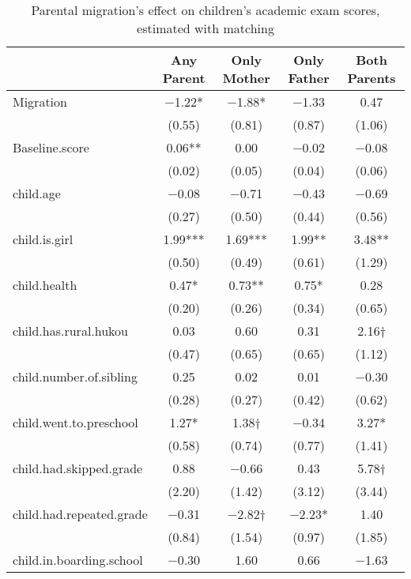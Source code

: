 \documentclass[
  man,floatsintext]{apa7}
\begin{document}
\begin{table}

\caption{Parental migration’s effect on children’s academic exam scores, estimated with matching}
\centering
\begin{tabular}[t]{lcccc}
\toprule
  & Any Parent & Only Mother & Only Father & Both Parents\\
\midrule
Migration & \num{-1.22}* & \num{-1.88}* & \num{-1.33} & \num{0.47}\\
 & (\num{0.55}) & (\num{0.81}) & (\num{0.87}) & (\num{1.06})\\
Baseline.score & \num{0.06}** & \num{0.00} & \num{-0.02} & \num{-0.08}\\
 & (\num{0.02}) & (\num{0.05}) & (\num{0.04}) & (\num{0.06})\\
child.age & \num{-0.08} & \num{-0.71} & \num{-0.43} & \num{-0.69}\\
 & (\num{0.27}) & (\num{0.50}) & (\num{0.44}) & (\num{0.56})\\
child.is.girl & \num{1.99}*** & \num{1.69}*** & \num{1.99}** & \num{3.48}**\\
 & (\num{0.50}) & (\num{0.49}) & (\num{0.61}) & (\num{1.29})\\
child.health & \num{0.47}* & \num{0.73}** & \num{0.75}* & \num{0.28}\\
 & (\num{0.20}) & (\num{0.26}) & (\num{0.34}) & (\num{0.65})\\
child.has.rural.hukou & \num{0.03} & \num{0.60} & \num{0.31} & \num{2.16}†\\
 & (\num{0.47}) & (\num{0.65}) & (\num{0.65}) & (\num{1.12})\\
child.number.of.sibling & \num{0.25} & \num{0.02} & \num{0.01} & \num{-0.30}\\
 & (\num{0.28}) & (\num{0.27}) & (\num{0.42}) & (\num{0.62})\\
child.went.to.preschool & \num{1.27}* & \num{1.38}† & \num{-0.34} & \num{3.27}*\\
 & (\num{0.58}) & (\num{0.74}) & (\num{0.77}) & (\num{1.41})\\
child.had.skipped.grade & \num{0.88} & \num{-0.66} & \num{0.43} & \num{5.78}†\\
 & (\num{2.20}) & (\num{1.42}) & (\num{3.12}) & (\num{3.44})\\
child.had.repeated.grade & \num{-0.31} & \num{-2.82}† & \num{-2.23}* & \num{1.40}\\
 & (\num{0.84}) & (\num{1.54}) & (\num{0.97}) & (\num{1.85})\\
child.in.boarding.school & \num{-0.30} & \num{1.60} & \num{0.66} & \num{-1.63}\\

\end{tabular}
\end{table}
\end{document}
